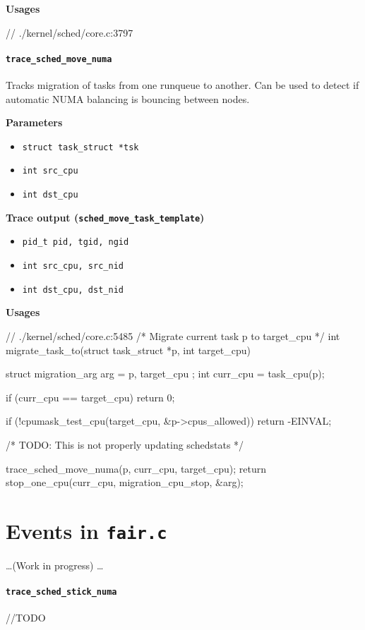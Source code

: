 \textbf{Usages}
\begin{code}
// ./kernel/sched/core.c:3797
\end{code}

\paragraph{\texttt{trace\_sched\_move\_numa}}
Tracks migration of tasks from one runqueue to another. Can be used to detect if automatic NUMA balancing is bouncing between nodes.

\textbf{Parameters}
\begin{itemize}
    \item \verb|struct task_struct *tsk|
    \item \verb|int src_cpu|
    \item \verb|int dst_cpu|
\end{itemize}

\textbf{Trace output (\texttt{sched\_move\_task\_template})}
\begin{itemize}
    \item \verb|pid_t pid, tgid, ngid|
    \item \verb|int src_cpu, src_nid|
    \item \verb|int dst_cpu, dst_nid|
\end{itemize}

\textbf{Usages}
\begin{code}
// ./kernel/sched/core.c:5485
/* Migrate current task p to target_cpu */
int migrate_task_to(struct task_struct *p, int target_cpu) {
	struct migration_arg arg = { p, target_cpu };
	int curr_cpu = task_cpu(p);

	if (curr_cpu == target_cpu)
		return 0;

	if (!cpumask_test_cpu(target_cpu, &p->cpus_allowed))
		return -EINVAL;

	/* TODO: This is not properly updating schedstats */

	trace_sched_move_numa(p, curr_cpu, target_cpu);
	return stop_one_cpu(curr_cpu, migration_cpu_stop, &arg);
}
\end{code}

\section{Events in \texttt{fair.c}}
\dots (Work in progress) \dots
\paragraph{\texttt{trace\_sched\_stick\_numa}}
//TODO

